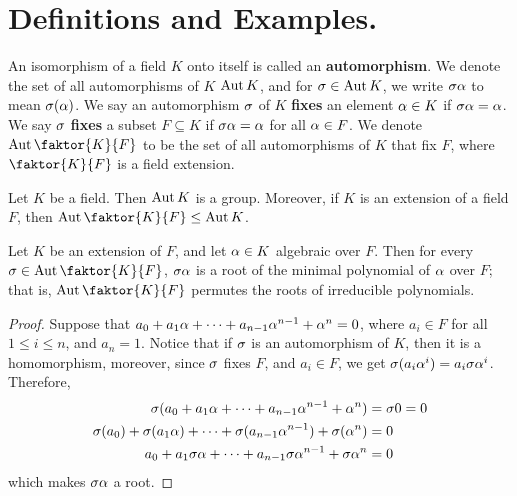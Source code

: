 \section{Definitions and Examples.}

\begin{definition}
    An isomorphism of a field $K$ onto itself is called an
    \textbf{automorphism}. We denote the set of all automorphisms of $K$
    $\operatorname{Aut}{K}$, and for $\sigma \in \operatorname{Aut}{K}$,  we write $\sigma\alpha$ to mean  $\sigma(\alpha)$. We
    say an automorphism $\sigma$ of  $K$  \textbf{fixes} an element $\alpha \in K$ if
    $\sigma\alpha=\alpha$. We say  $\sigma$  \textbf{fixes} a subset $F \subseteq K$ if
    $\sigma\alpha=\alpha$ for all  $\alpha \in F$. We denote  $\Aut{\faktor{K}{F}}$ to be the
    set of all automorphisms of $K$ that fix $F$, where $\faktor{K}{F}$ is a
    field extension.
\end{definition}

\begin{lemma}\label{2.1.1}
    Let $K$ be a field. Then  $\operatorname{Aut}{K}$ is a group. Moreover, if $K$ is an
    extension of a field $F$, then $\Aut{\faktor{K}{F}} \leq \Aut{K}$.
\end{lemma}

\begin{lemma}\label{2.1.2}
    Let $K$ be an extension of  $F$, and let  $\alpha \in K$ algebraic over  $F$.
    Then for every  $\s \in \Aut{\faktor{K}{F}}$, $\sigma\alpha$ is a root of the
    minimal polynomial of  $\alpha$ over  $F$; that is,  $\Aut{\faktor{K}{F}}$
    permutes the roots of irreducible polynomials.
\end{lemma}
\begin{proof}
    Suppose that $a_0+a_1\alpha+\dots+a_{n-1}\alpha^{n-1}+\alpha^n=0$, where $a_i \in F$
    for all  $1 \leq i \leq n$, and  $a_n=1$. Notice that if $\sigma$ is an
    automorphism of $K$, then it is a homomorphism, moreover, since $\sigma$ fixes
    $F$, and $a_i \in F$, we get $ \sigma(a_i\alpha^i)=a_i\sigma\alpha^i$. Therefore,
    \begin{align*}
        \sigma(a_0+a_1\alpha+\dots+a_{n-1}\alpha^{n-1}+\alpha^n)  &=  \sigma0=0   \\
        \sigma(a_0)+\sigma(a_1\alpha)+\dots+\sigma(a_{n-1}\alpha^{n-1})+\sigma(\alpha^n)  &=  0   \\
        a_0+a_1\sigma\alpha+\dots+a_{n-1}\sigma\alpha^{n-1}+\sigma\alpha^n  &=  0   \\
    \end{align*}
    which makes $\sigma\alpha$ a root.
\end{proof}

